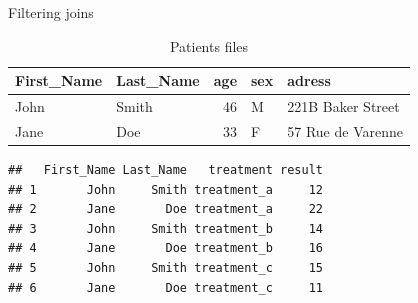 \documentclass[14pt,ignorenonframetext,]{bredelebeamer}
\newenvironment{Shaded}{\begin{snugshade}}{\end{snugshade}}
\newcommand{\KeywordTok}[1]{\textcolor[rgb]{0.94,0.87,0.69}{#1}}
\newcommand{\DataTypeTok}[1]{\textcolor[rgb]{0.87,0.87,0.75}{#1}}
\newcommand{\DecValTok}[1]{\textcolor[rgb]{0.86,0.86,0.80}{#1}}
\newcommand{\StringTok}[1]{\textcolor[rgb]{0.80,0.58,0.58}{#1}}
\newcommand{\OperatorTok}[1]{\textcolor[rgb]{0.94,0.94,0.82}{#1}}
\newcommand{\NormalTok}[1]{\textcolor[rgb]{0.80,0.80,0.80}{#1}}
\begin{document}
\begin{frame}[fragile]{Filtering joins}

\begin{table}[t]

\caption{\label{tab:unnamed-chunk-53}Patients files}
\centering
\begin{tabular}{l|l|r|l|l}
\hline
First\_Name & Last\_Name & age & sex & adress\\
\hline
John & Smith & 46 & M & 221B Baker Street\\
\hline
Jane & Doe & 33 & F & 57 Rue de Varenne\\
\hline
\end{tabular}
\end{table}

\begin{Shaded}
\end{Shaded}

\begin{verbatim}
##   First_Name Last_Name   treatment result
## 1       John     Smith treatment_a     12
## 2       Jane       Doe treatment_a     22
## 3       John     Smith treatment_b     14
## 4       Jane       Doe treatment_b     16
## 5       John     Smith treatment_c     15
## 6       Jane       Doe treatment_c     11
\end{verbatim}

\end{frame}
\end{document}

